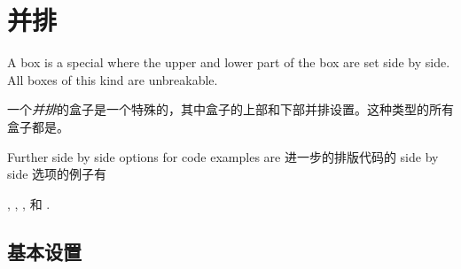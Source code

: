 
\setcounter{section}{5}
\setcounter{subsection}{2}

\section{并排}\label{sec:sidebyside}%
%

A  box is a special  where
the upper and lower part of the box are set side by side.
All boxes of this kind are unbreakable.


一个\emph{并排}的盒子是一个特殊的，其中盒子的上部和下部并排设置。这种类型的所有盒子都是。


\begin{marker}
\begin{stripedbox}
Further side by side options for code examples are
\tcblower
进一步的排版代码的 side by side 选项的例子有
\end{stripedbox}

,
,
, 和
.
\end{marker}

\subsection{基本设置}\label{subsec:sidebyside_basic}

